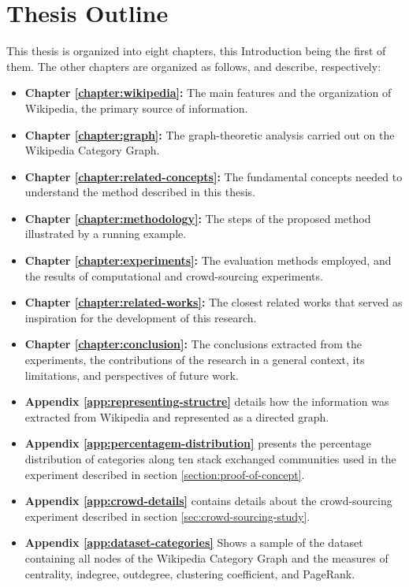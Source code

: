 \section{\hspace*{3pt}Thesis Outline}

This thesis is organized into eight chapters, this Introduction being the first of them. The other chapters are organized as follows, and describe, respectively:

\begin{itemize}

\item \textbf {Chapter \ref{chapter:wikipedia}:} The main features and the organization of Wikipedia, the primary source of information.


\item \textbf {Chapter \ref{chapter:graph}:} The graph-theoretic analysis carried out on the Wikipedia Category Graph.

\item\textbf {Chapter \ref{chapter:related-concepts}:} The fundamental concepts needed to understand the method described in this thesis.

\item \textbf {Chapter \ref{chapter:methodology}:} The steps of the proposed method illustrated by a running example.

\item \textbf {Chapter \ref{chapter:experiments}:} The evaluation methods employed, and the results of computational and crowd-sourcing experiments.

\item \textbf {Chapter \ref{chapter:related-works}:} The closest related works that served as inspiration for the development of this research.

\item \textbf {Chapter \ref{chapter:conclusion}:} The conclusions extracted from the experiments, the contributions of the research in a general context, its limitations, and perspectives of future work.

\item \textbf{Appendix \ref{app:representing-structre}} details how the information was extracted from Wikipedia and represented as a directed graph.

\item \textbf{Appendix \ref{app:percentagem-distribution}} presents the percentage distribution of categories along ten stack exchanged communities used in the experiment described in section \ref{section:proof-of-concept}.

\item \textbf{Appendix \ref{app:crowd-details}} contains details about the crowd-sourcing experiment described in section \ref{sec:crowd-sourcing-study}.

\item \textbf{Appendix \ref{app:dataset-categories}} Shows a sample of the dataset containing all nodes of the Wikipedia Category Graph and the measures of centrality, indegree, outdegree, clustering coefficient, and PageRank. %


\end{itemize}
